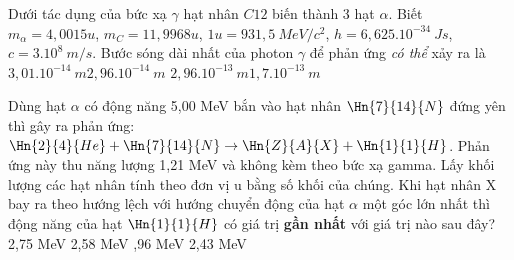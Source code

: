 \begin{vidu}%
Dưới tác dụng của bức xạ $\gamma$ hạt nhân $C12$ biến thành 3 hạt $\alpha$. Biết $m_{\alpha}=4,0015u$, $m_C=11,9968u$, $1u=931,5\ MeV/c^2$, $h=6,{625.10}^{- 34}\ Js$, $c={3.10}^{8}\ m/s$. Bước sóng dài nhất của photon $\gamma$ để phản ứng \textit{có thể} xảy ra là
\choice
{$3,{01.10}^{- 14}\ m$}{$2,{96.10}^{- 14}\ m$}
{$2,{96.10}^{- 13}\ m$}{\True $1,{7.10}^{- 13}\ m$}
\end{vidu}
\begin{vidu}%
 Dùng hạt $\alpha$ có động năng 5,00 MeV bắn vào hạt nhân $\Hn{7}{14}{N}$ đứng yên thì gây ra phản ứng: $\Hn{2}{4}{He}+\Hn{7}{14}{N}\rightarrow \Hn{Z}{A}{X}+\Hn{1}{1}{H}$. Phản ứng này thu năng lượng 1,21 MeV và không kèm theo bức xạ gamma. Lấy khối lượng các hạt nhân tính theo đơn vị u bằng số khối của chúng. Khi hạt nhân X bay ra theo hướng lệch với hướng chuyển động của hạt $\alpha$ một góc lớn nhất thì động năng của hạt $\Hn{1}{1}{H}$ có giá trị \textbf{gần nhất} với giá trị nào sau đây?
\choice
{2,75 MeV}
{2,58 MeV}
{,96 MeV}
{2,43 MeV}
\end{vidu}

